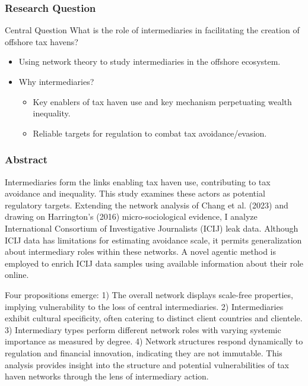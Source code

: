 \documentclass{beamer}
\begin{document}

\begin{frame}
    \frametitle{Research Question}

    \begin{block}{Central Question}
        What is the role of intermediaries in facilitating the creation of offshore tax havens?
    \end{block}

    \begin{itemize}
        \item Using network theory to study intermediaries in the offshore ecosystem.
        \item Why intermediaries?
        \begin{itemize}
            \item Key enablers of tax haven use and key mechanism perpetuating wealth inequality.
            \item Reliable targets for regulation to combat tax avoidance/evasion.
        \end{itemize}
    \end{itemize}
\end{frame}

\begin{frame}[allowframebreaks] 
    \frametitle{Abstract}

    {\tiny Intermediaries form the links enabling tax haven use, contributing to tax avoidance and inequality. This study examines these actors as potential regulatory targets. Extending the network analysis of Chang et al. (2023) and drawing on Harrington's (2016) micro-sociological evidence, I analyze International Consortium of Investigative Journalists (ICIJ) leak data. Although ICIJ data has limitations for estimating avoidance scale, it permits generalization about intermediary roles within these networks. A novel agentic method is employed to enrich ICIJ data samples using available information about their role online.}

    {\tiny Four propositions emerge: 1) The overall network displays scale-free properties, implying vulnerability to the loss of central intermediaries. 2) Intermediaries exhibit cultural specificity, often catering to distinct client countries and clientele. 3) Intermediary types perform different network roles with varying systemic importance as measured by degree. 4) Network structures respond dynamically to regulation and financial innovation, indicating they are not immutable. This analysis provides insight into the structure and potential vulnerabilities of tax haven networks through the lens of intermediary action.}
\end{frame}
\end{document}
